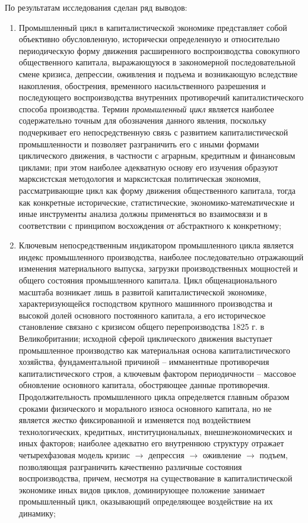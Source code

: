 По результатам исследования сделан ряд выводов:
\begin{enumerate}
    \item Промышленный цикл в капиталистической экономике представляет собой объективно обусловленную, исторически определенную и относительно периодическую форму движения расширенного воспроизводства совокупного общественного капитала, выражающуюся в закономерной последовательной смене кризиса, депрессии, оживления и подъема и возникающую вследствие накопления, обострения, временного насильственного разрешения и последующего воспроизводства внутренних противоречий капиталистического способа производства. Термин \textit{промышленный цикл} является наиболее содержательно точным для обозначения данного явления, поскольку подчеркивает его непосредственную связь с развитием капиталистической промышленности и позволяет разграничить его с иными формами циклического движения, в частности с аграрным, кредитным и финансовым циклами; при этом наиболее адекватную основу его изучения образуют марксистская методология и марксистская политическая экономия, рассматривающие цикл как форму движения общественного капитала, тогда как конкретные исторические, статистические, экономико-математические и иные инструменты анализа должны применяться во взаимосвязи и в соответствии с принципом восхождения от абстрактного к конкретному;
    \item Ключевым непосредственным индикатором промышленного цикла является индекс промышленного производства, наиболее последовательно отражающий изменения материального выпуска, загрузки производственных мощностей и общего состояния промышленного капитала. Цикл общенационального масштаба возникает лишь в развитой капиталистической экономике, характеризующейся господством крупного машинного производства и высокой долей основного постоянного капитала, а его историческое становление связано с кризисом общего перепроизводства 1825 г. в Великобритании; исходной сферой циклического движения выступает промышленное производство как материальная основа капиталистического хозяйства, фундаментальной причиной – имманентные противоречия капиталистического строя, а ключевым фактором периодичности – массовое обновление основного капитала, обостряющее данные противоречия. Продолжительность промышленного цикла определяется главным образом сроками физического и морального износа основного капитала, но не является жестко фиксированной и изменяется под воздействием технологических, кредитных, институциональных, внешнеэкономических и иных факторов; наиболее адекватно его внутреннюю структуру отражает четырехфазовая модель \textquotedbl{}кризис $\to$ депрессия $\to$ оживление $\to$ подъем\textquotedbl{}, позволяющая разграничить качественно различные состояния воспроизводства, причем, несмотря на существование в капиталистической экономике иных видов циклов, доминирующее положение занимает промышленный цикл, оказывающий определяющее воздействие на их динамику;

\end{enumerate}
